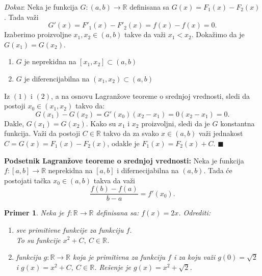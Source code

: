 \documentclass{article}
\newtheorem{prim}{Primer}[section]
\begin{document}
\textit{Dokaz}: Neka je funkcija $G: \left(a, b\right) \longrightarrow \mathbb{R}$
definisana sa $G\left(x\right) = F_1\left(x\right) - F_2\left(x\right)$. Tada važi
$$G'\left(x\right) = F'_1\left(x\right) - F'_2\left(x\right) = f\left(x\right) - f\left(x\right) = 0.$$
Izaberimo proizvoljne $x_1, x_2 \in \left(a, b\right)$ takve da važi
$x_1 < x_2$. Dokažimo da je $G\left(x_1\right) = G\left(x_2\right)$.
\begin{enumerate}[label=(\arabic*)]
    \item $G$ je neprekidna na $\left[x_1, x_2\right] \subset \left(a, b\right)$
    \item $G$ je diferencijabilna na $\left(x_1, x_2\right) \subset \left(a, b\right)$
\end{enumerate}
Iz $\left(1\right)$ i $\left(2\right)$, a na osnovu Lagranžove teoreme o srednjoj vrednosti,
sledi da postoji $x_0 \in \left(x_1, x_2\right)$ takvo da:
$$G\left(x_1\right) - G\left(x_2\right) = G'\left(x_0\right)\left(x_2-x_1\right) = 0  \left(x_2-x_1\right) = 0.$$
Dakle, $G\left(x_1\right) = G\left(x_2\right)$. Kako su $x_1$ i $x_2$
proizvoljni, sledi da je $G$ konstantna funkcija. Važi
da postoji $C\in\mathbb{R}$ takvo da za svako $x\in\left(a, b\right)$ važi
jednakost $C=G\left(x\right) =F_1\left(x\right) - F_2\left(x\right)$, odakle je $F_1\left(x\right) = F_2\left(x\right) + C$.
\null\hfill $\blacksquare$\par

\begin{teoremabox}
    \label{podsetnik_teoreme_2}
    \textbf{Podsetnik Lagranžove teoreme o srednjoj vrednosti:} Neka je funkcija
    $f : \left[a,b\right]\longrightarrow\mathbb{R}$ neprekidna na $\left[a,b\right]$
    i difernecijabilna na $\left(a,b\right)$. Tada će
    postojati tačka $x_0\in\left(a,b\right)$ takva da važi
    $$\displaystyle\frac{f\left(b\right)-f\left(a\right)}{b-a}=f'\left(x_0\right).$$
\end{teoremabox}

\begin{primbox}
    \label{primer_1.1}
    \begin{prim}
        Neka je $f: \mathbb{R} \longrightarrow \mathbb{R}$
        definisana sa: $f\left(x\right) = 2x$. Odrediti:
        \begin{enumerate}[label=\alph*)]
            \item sve primitivne funkcije za funkciju $f$.\\
                  To su funkcije $x^2 + C,\  C \in \mathbb{R}$.
            \item funkciju $g: \mathbb{R} \longrightarrow \mathbb{R}$
                  koja je primitivna za funkciju $f$ i za koju važi
                  $g\left(0\right) = \sqrt{2}$ i $g\left(x\right) = x^2 + C,\ C \in \mathbb{R}$.
                  Rešenje je $g\left(x\right) = x^2 + \sqrt{2}$.
        \end{enumerate}
    \end{prim}
\end{primbox}
\end{document}
